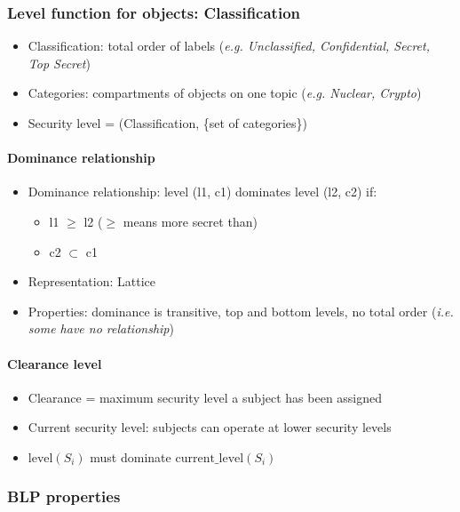 \documentclass{article}
\newenvironment{myitemize}
{ \begin{itemize}
    \setlength{\itemsep}{005pt}
    \setlength{\parskip}{0pt}
    \setlength{\parsep}{0pt}     }
{ \end{itemize}                  }
\begin{document}
\begin{multicols}{2}
\subsubsection{Level function for objects: Classification}

\begin{myitemize}
    \item Classification: total order of labels (\textit{e.g. Unclassified, Confidential, Secret, Top Secret})
    \item Categories: compartments of objects on one topic (\textit{e.g. Nuclear, Crypto})
    \item Security level = (Classification, \{set of categories\})
\end{myitemize}

\paragraph{Dominance relationship}

\begin{myitemize}
    \item Dominance relationship: level (l1, c1) dominates level (l2, c2) if:
    \begin{myitemize}
        \item l1 $\geq$ l2 ($\geq$ means more secret than)
        \item c2 $\subset$ c1
    \end{myitemize}
    \item Representation: Lattice
    \item Properties: dominance is transitive, top and bottom levels, no total order (\textit{i.e. some have no relationship})
\end{myitemize}

\paragraph{Clearance level}

\begin{myitemize}
    \item Clearance = maximum security level a subject has been assigned
    \item Current security level: subjects can operate at lower security levels
    \item $\text{level}(S_i)$ must dominate $\text{current\_level}(S_i)$
\end{myitemize}

\subsubsection{BLP properties}


\end{multicols}
\end{document}

